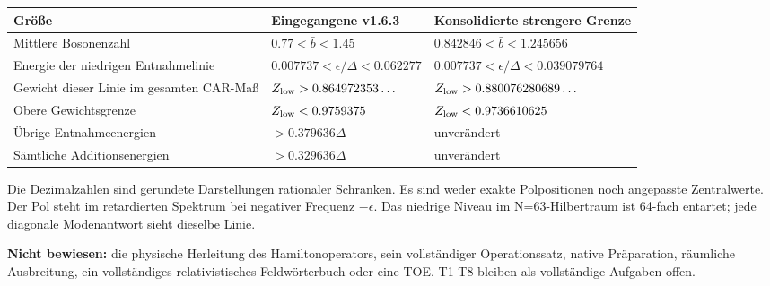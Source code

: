 {\def\LTcaptype{none} %
\begin{longtable}[]{@{}
  >{\raggedright\arraybackslash}p{}
  >{\raggedleft\arraybackslash}p{}
  >{\raggedleft\arraybackslash}p{}@{}}
\toprule\noalign{}
\begin{minipage}[b]{\linewidth}\raggedright
Größe
\end{minipage} & \begin{minipage}[b]{\linewidth}\raggedleft
Eingegangene v1.6.3
\end{minipage} & \begin{minipage}[b]{\linewidth}\raggedleft
Konsolidierte strengere Grenze
\end{minipage} \\
\midrule\noalign{}
\endhead
\bottomrule\noalign{}
\endlastfoot
Mittlere Bosonenzahl & \(0.77<\bar b<1.45\) &
\(0.842846<\bar b<1.245656\) \\
Energie der niedrigen Entnahmelinie &
\(0.007737<\epsilon/\Delta<0.062277\) &
\(0.007737<\epsilon/\Delta<0.039079764\) \\
Gewicht dieser Linie im gesamten CAR-Maß &
\(Z_{\rm low}>0.864972353\ldots\) &
\(Z_{\rm low}>0.880076280689\ldots\) \\
Obere Gewichtsgrenze & \(Z_{\rm low}<0.9759375\) &
\(Z_{\rm low}<0.9736610625\) \\
Übrige Entnahmeenergien & \(>0.379636\Delta\) & unverändert \\
Sämtliche Additionsenergien & \(>0.329636\Delta\) & unverändert \\
\end{longtable}
}

Die Dezimalzahlen sind gerundete Darstellungen rationaler Schranken. Es
sind weder exakte Polpositionen noch angepasste Zentralwerte. Der Pol
steht im retardierten Spektrum bei negativer Frequenz \(-\epsilon\). Das
niedrige Niveau im N=63-Hilbertraum ist 64-fach entartet; jede diagonale
Modenantwort sieht dieselbe Linie.

\textbf{Nicht bewiesen:} die physische Herleitung des Hamiltonoperators,
sein vollständiger Operationssatz, native Präparation, räumliche
Ausbreitung, ein vollständiges relativistisches Feldwörterbuch oder eine
TOE. T1-T8 bleiben als vollständige Aufgaben offen.

